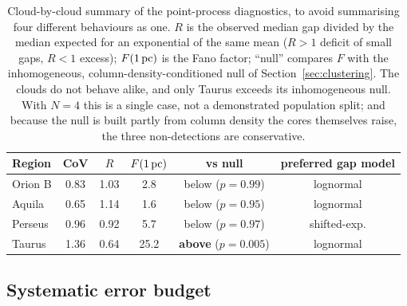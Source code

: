 \documentclass[usenatbib,twoside,twocolumn]{mnras}
\begin{document}
\begin{table}
\caption{Cloud-by-cloud summary of the point-process diagnostics, to avoid summarising four different behaviours as one. $R$ is the observed median gap divided by the median expected for an exponential of the same mean ($R>1$ deficit of small gaps, $R<1$ excess); $F(1\,{\rm pc})$ is the Fano factor; ``null'' compares $F$ with the inhomogeneous, column-density-conditioned null of Section~\ref{sec:clustering}. The clouds do not behave alike, and only Taurus exceeds its inhomogeneous null. With $N=4$ this is a single case, not a demonstrated population split; and because the null is built partly from column density the cores themselves raise, the three non-detections are conservative.}
\label{tab:percloud}
\footnotesize
\setlength{\tabcolsep}{3.5pt}
\begin{tabular}{lccccc}
\toprule
Region & CoV & $R$ & $F(1\,{\rm pc})$ & vs null & preferred gap model \\
\midrule
Orion B & 0.83 & 1.03 & 2.8 & below ($p=0.99$) & lognormal \\
Aquila  & 0.65 & 1.14 & 1.6 & below ($p=0.95$) & lognormal \\
Perseus & 0.96 & 0.92 & 5.7 & below ($p=0.97$) & shifted-exp. \\
Taurus  & 1.36 & 0.64 & 25.2 & \textbf{above} ($p=0.005$) & lognormal \\
\bottomrule
\end{tabular}
\end{table}

\subsection{Systematic error budget}
\label{sec:error_budget}
\end{document}
